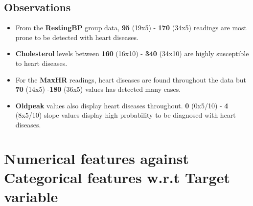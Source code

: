 \subsection*{Observations}
\begin{itemize}
    \item From the \textbf{RestingBP} group data, \textbf{95} (19x5) - \textbf{170} (34x5) readings are most prone to be detected with heart diseases.
    \item \textbf{Cholesterol} levels between \textbf{160} (16x10) - \textbf{340} (34x10) are highly susceptible to heart diseases.
    \item For the \textbf{MaxHR} readings, heart diseases are found throughout the data but \textbf{70} (14x5) -\textbf{180} (36x5) values has detected many cases. 
    \item \textbf{Oldpeak} values also display heart diseases throughout. \textbf{0} (0x5/10) - \textbf{4} (8x5/10) slope values display high probability to be diagnosed with heart diseases.
\end{itemize}

\section{Numerical features against Categorical features w.r.t Target variable}
